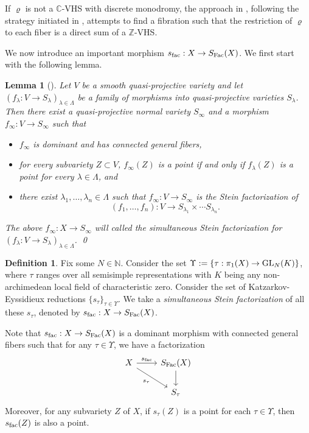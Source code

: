 \documentclass[english]{amsproc}
\theoremstyle{plain}
\newtheorem{lem}[thm]{Lemma}
\theoremstyle{definition}
\newtheorem{dfn}[thm]{Definition}
\theoremstyle{remark}
\theoremstyle{plain}
\numberwithin{equation}{thm} %
\newcommand{\bC}{\mathbb{C}}
\newcommand{\bN}{\mathbb{N}}
\newcommand{\bZ}{\mathbb{Z}}
\newcommand{\GL}{{\rm GL}}
\begin{document}
If $\varrho$ is not a   $\bC$-VHS with discrete monodromy, the approach in \cite{DY23}, following the strategy initiated in \cite{Eys04}, attempts to find a fibration such that the restriction of $\varrho$ to each fiber is a direct sum of a $\bZ$-VHS.


We now introduce an important morphism $s_{\rm fac}:X\to S_{\rm Fac}(X)$. We first start with the following lemma.  
\begin{lem}[{\cite[Lemma 1.28]{DY23}}]\label{lem:simultaneous}
	Let $V$ be a smooth quasi-projective  variety and let $(f_{\lambda}:V\to S_{\lambda})_{\lambda\in\Lambda}$ be a family of   morphisms into  quasi-projective varieties $S_{\lambda}$.
	Then there exist a  quasi-projective normal
	variety $S_{\infty}$ and a morphism $f_{\infty}:V\to S_{\infty}$ such that 
	\begin{itemize}
		\item
		$f_{\infty}$ is  dominant and has connected  general fibers,
		\item for every subvariety $Z\subset V$, $f_{\infty}(Z)$ is a point if and only if $f_{\lambda}(Z)$ is a point for every $\lambda\in \Lambda$, 
		and
		\item
		there exist $\lambda_1,\ldots,\lambda_n\in\Lambda$ such that $f_{\infty}:V\to S_{\infty}$ is the  Stein factorization of $$(f_1,\ldots,f_n):V\to S_{\lambda_1}\times\cdots S_{\lambda_n}.$$ 
	\end{itemize} 
	The above $f_\infty:X\to S_\infty$ will called the \emph{simultaneous Stein factorization} for $(f_{\lambda}:V\to S_{\lambda})_{\lambda\in\Lambda}$.  \qed
\end{lem}

\medspace

\begin{dfn}\label{def:fac}
	Fix some $N\in \bN$.	 Consider the set $\Upsilon:=\{\tau:\pi_1(X)\to \GL_N(K)\}$, where $\tau$ ranges over all semisimple representations with $K$ being any non-archimedean local field of characteristic zero. Consider the set of Katzarkov-Eyssidieux reductions $\{s_\tau\}_{\tau\in\Upsilon}$. We take a \emph{simultaneous Stein factorization} of all these $s_\tau$, denoted by $s_{\rm fac}:X\to S_{\rm Fac}(X)$. 
\end{dfn}
Note that  $s_{\rm fac}:X\to S_{\rm Fac}(X)$   is a dominant morphism with connected general fibers such that for any $\tau\in \Upsilon$, we have a factorization
\[
\begin{tikzcd}
	X\arrow[r,"s_{\rm fac}"] \arrow[dr,"s_\tau"'] & S_{\rm Fac}(X)\arrow[d]\\
	& S_\tau
\end{tikzcd}
\]
Moreover, for any subvariety $Z$ of $X$, if $s_\tau(Z)$ is a point for each $\tau\in \Upsilon$, then $s_{\rm fac}(Z)$ is also a point.
\end{document}
